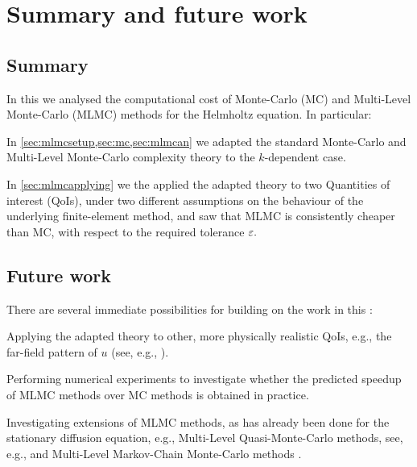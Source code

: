 \section{Summary and future work}

\subsection{Summary}
In this  we analysed the computational cost of Monte-Carlo (MC) and Multi-Level Monte-Carlo (MLMC) methods for the Helmholtz equation. In particular:
\bit
\item In \cref{sec:mlmcsetup,sec:mc,sec:mlmcan} we adapted the standard Monte-Carlo and Multi-Level Monte-Carlo complexity theory to the $k$-dependent case.
  \item In \cref{sec:mlmcapplying} we the applied the adapted theory to two Quantities of interest (QoIs), under two different assumptions on the behaviour of the underlying finite-element method, and saw that MLMC is consistently cheaper than MC, with respect to the required tolerance $\varepsilon.$
\eit

\subsection{Future work}
There are several immediate possibilities for building on the work in this :
\bit
\item Applying the adapted theory to other, more physically realistic QoIs, e.g., the far-field pattern of $u$ (see, e.g., \cite[Section 2.5]{CoKr:13}).
\item Performing numerical experiments to investigate whether the predicted speedup of MLMC methods over MC methods is obtained in practice.
  \item Investigating extensions of MLMC methods, as has already been done for the stationary diffusion equation, e.g., Multi-Level Quasi-Monte-Carlo methods, see, e.g., \cite{KuScScSlUl:17} and Multi-Level Markov-Chain Monte-Carlo methods \cite{DoKeScTe:15}.
\eit
